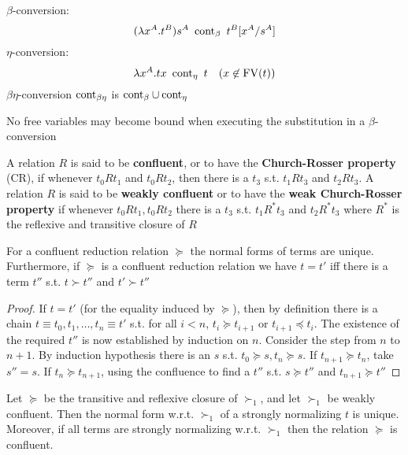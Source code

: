 \documentclass[11pt]{article}
\begin{document}
\(\beta\)-conversion:
\begin{equation*}
(\lambda x^A.t^B) s^A\enspace\text{cont}_\beta\enspace t^B[x^A/s^A]
\end{equation*}
\(\eta\)-conversion:
\begin{equation*}
\lambda x^A.tx\enspace\text{cont}_\eta\enspace  t\quad(x\not\in\text{FV}(t))
\end{equation*}
\(\beta \eta\)-conversion \(\text{cont}_{\beta\eta}\) is \(\text{cont}_\beta\cup\text{cont}_\eta\)

No free variables may become bound when executing the substitution in a \(\beta\)-conversion

\begin{definition}[]
A relation \(R\) is said to be \textbf{confluent}, or to have the \textbf{Church-Rosser property}
(CR), if whenever \(t_0 Rt_1\) and \(t_0Rt_2\), then there is a \(t_3\) s.t.
\(t_1Rt_3\) and \(t_2Rt_3\). A relation \(R\) is said to be \textbf{weakly confluent} or to
have the \textbf{weak Church-Rosser property} if whenever \(t_0Rt_1,t_0Rt_2\) there is a
\(t_3\) s.t. \(t_1R^*t_3\) and \(t_2R^* t_3\) where \(R^*\) is the reflexive and
transitive closure of \(R\)
\end{definition}

\begin{theorem}[]
For a confluent reduction relation \(\succeq\) the normal forms of terms are
unique. Furthermore, if \(\succeq\) is a confluent reduction relation we have
\(t=t'\) iff there is a term \(t''\) s.t. \(t\succ t''\) and \(t'\succ t''\)
\end{theorem}

\begin{proof}
If \(t=t'\) (for the equality induced by \(\succeq\)), then by definition
there is a chain \(t\equiv t_0,t_1,\dots,t_n\equiv t'\) s.t. for all \(i<n\),
\(t_i\succeq t_{i+1}\) or \(t_{i+1}\preceq t_i\). The existence of the
required \(t''\) is now established by induction on \(n\). Consider the step
from \(n\) to \(n+1\). By induction hypothesis there is an \(s\) s.t.
\(t_0\succeq s,t_n\succeq s\). If \(t_{n+1}\succeq t_n\), take \(s''=s\). If
\(t_n\succeq t_{n+1}\), using the confluence to find a \(t''\) s.t.
\(s\succeq t''\) and \(t_{n+1}\succeq t''\)
\end{proof}

\begin{theorem}
Let \(\succeq\) be the transitive and reflexive closure of \(\succ_1\), and let
\(\succ_1\) be weakly confluent. Then the normal form w.r.t. \(\succ_1\) of a
strongly normalizing \(t\) is unique. Moreover, if all terms are strongly
normalizing w.r.t. \(\succ_1\) then the relation \(\succeq\) is confluent.
\end{theorem}
\end{document}
